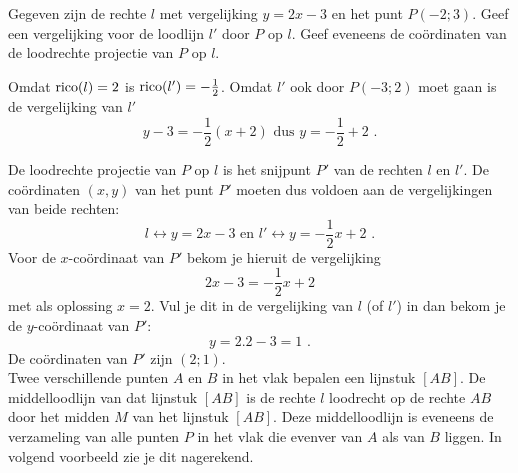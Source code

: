 \begin{voorbeeld}
	Gegeven zijn de rechte $l$ met vergelijking $y=2x-3$ en het punt $P(-2;3)$.
Geef een vergelijking voor de loodlijn $l'$ door $P$ op $l$.
Geef eveneens de co\"ordinaten van de loodrechte projectie van $P$ op $l$.



Omdat $\operatorname{rico} (l)=2$ is $\operatorname{rico} (l')=-\frac{1}{2}$.
Omdat $l'$ ook door $P(-3;2)$ moet gaan is de vergelijking van $l'$
\[
y-3=-\frac{1}{2}(x+2) \text { dus } y=-\frac{1}{2}+2 \text { .}
\]

De loodrechte projectie van $P$ op $l$ is het snijpunt $P'$ van de rechten $l$ en $l'$.
De co\"ordinaten $(x,y)$ van het punt $P'$ moeten dus voldoen aan de vergelijkingen van beide rechten:
\[
l \leftrightarrow y=2x-3 \text { en } l' \leftrightarrow y=-\frac{1}{2}x+2 \text { .}
\]
Voor de $x$-co\"ordinaat van $P'$ bekom je hieruit de vergelijking
\[
2x-3=-\frac{1}{2}x+2
\]
met als oplossing $x=2$.
Vul je dit in de vergelijking van $l$ (of $l'$) in dan bekom je de $y$-co\"ordinaat van $P'$:
\[
y=2.2-3=1 \text { .}
\]
De co\"ordinaten van $P'$ zijn $(2;1)$.\\

Twee verschillende punten $A$ en $B$ in het vlak bepalen een lijnstuk $[AB]$.
De middelloodlijn van dat lijnstuk $[AB]$ is de rechte $l$ loodrecht op de rechte $AB$ door het midden $M$ van het lijnstuk $[AB]$.
Deze middelloodlijn is eveneens de verzameling van alle punten $P$ in het vlak die evenver van $A$ als van $B$ liggen.
In volgend voorbeeld zie je dit nagerekend.\\

\end{voorbeeld}

